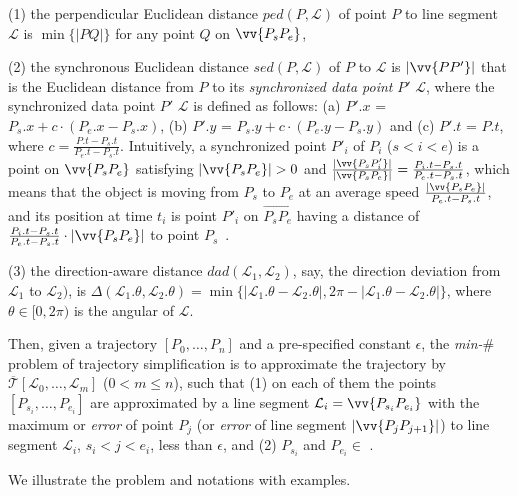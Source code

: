  (1) the perpendicular Euclidean distance $ped(P, \mathcal{L})$ of point $P$ to line segment $\mathcal{L}$ is $\min\{|PQ|\}$ for any point $Q$ on $\vv{P_{s}P_{e}}$,

 (2) the synchronous Euclidean distance $sed(P, \mathcal{L})$ of $P$ to $\mathcal{L}$ is $|\vv{PP'}|$ that is the Euclidean distance from $P$ to its \textit{synchronized data point} $P'$ \wrt $\mathcal{L}$, where the synchronized data point $P'$ \wrt $\mathcal{L}$ is defined as follows:
(a) $P'.x$ = $P_s.x +  c\cdot(P_e.x - P_s.x)$,
(b) $P'.y$ = $P_s.y +  c\cdot(P_e.y - P_s.y)$ and
(c) $P'.t$ = $P.t$, where $c= \frac{P.t-P_s.t}{P_e.t-P_s.t}$.
Intuitively, a synchronized point $P'_i$ of $P_i$ ($s<i<e$) is a point on $\vv{P_sP_{e}}$ satisfying $|\vv{P_sP_e}|>0$ and $\frac{|\vv{P_sP'_i}|}{|\vv{P_sP_e}|} = \frac{P_i.t - P_s.t}{P_e.t - P_s.t}$, which means that the object is moving from $P_s$ to $P_e$ at an average speed $\frac{|\vv{P_sP_e}|}{P_e.t-P_s.t}$, and its position at time $t_i$ is point $P'_i$ on $\overrightarrow{P_sP_{e}}$ having a distance of $\frac{P_i.t - P_s.t}{P_e.t - P_s.t}\cdot|\vv{P_sP_e}|$ to point $P_s$~\cite{Meratnia:Spatiotemporal, Chen:Fast, Zhang:Evaluation}.

 (3) the direction-aware distance $dad(\mathcal{L}_1, \mathcal{L}_2)$, say, the direction deviation from $\mathcal{L}_1$ to $\mathcal{L}_2)$, is $\Delta(\mathcal{L}_1.\theta, \mathcal{L}_2.\theta) = \min\{|\mathcal{L}_1.\theta - \mathcal{L}_2.\theta|, 2\pi - |\mathcal{L}_1.\theta - \mathcal{L}_2.\theta|\}$, where $\theta \in [0, 2\pi)$ is the angular of $\mathcal{L}$.



Then, given a trajectory $[P_0, \dots, P_n]$ and a pre-specified constant $\epsilon$, the \emph{min-$\#$} problem of trajectory simplification is to approximate the trajectory  by $\overline{\mathcal{T}}[\mathcal{L}_0, \ldots , \mathcal{L}_m]$ ($0< m \le n$), such that
(1) on each of them the points $[P_{s_i}, \dots, P_{e_i}]$ are approximated by a line segment $\mathcal{L}_i = \vv{P_{s_i}P_{e_i}}$ with the maximum \ped or \sed \emph{error} of point $P_j$ (or \dad \emph{error} of line segment $|\vv{P_jP_{j+1}}|$) to line segment $\mathcal{L}_i$, $s_i < j<e_i$,  less than $\epsilon$, and
(2) $P_{s_i}$ and $P_{e_i} \in$ .



We illustrate the problem and notations with examples.

